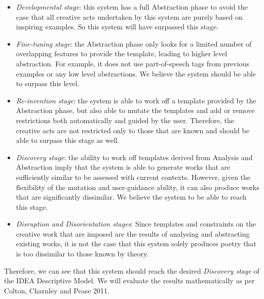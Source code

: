 \begin{itemize}
\setlength{\itemsep}{0pt}
\item{\emph{Developmental stage}: this system has a full Abstraction phase to avoid the case that all creative acts undertaken by this system are purely based on inspiring examples. So this system will have surpassed this stage.}
\item{\emph{Fine-tuning stage}: the Abstraction phase only looks for a limited number of overlapping features to provide the template, leading to higher level abstraction. For example, it does not use part-of-speech tags from previous examples or any low level abstractions. We believe the system should be able to surpass this level.}
\item{\emph{Re-invention stage}: the system is able to work off a template provided by the Abstraction phase, but also able to mutate the templates and add or remove restrictions both automatically and guided by the user. Therefore, the creative acts are not restricted only to those that are known and should be able to surpass this stage as well.}
\item{\emph{Discovery stage}: the ability to work off templates derived from Analysis and Abstraction imply that the system is able to generate works that are sufficiently similar to be assessed with current contexts. However, given the flexibility of the mutation and user-guidance ability, it can also produce works that are significantly dissimilar. We believe the system to be able to reach this stage.}
\item{\emph{Disruption and Disorientation stages}: Since templates and constraints on the creative work that are imposed are the results of analysing and abstracting existing works, it is not the case that this system solely produces poetry that is too dissimilar to those known by theory. }
\end{itemize}

Therefore, we can see that this system should reach the desired \emph{Discovery stage} of the IDEA Descriptive Model. We will evaluate the results mathematically as per Colton, Charnley and Pease 2011.



